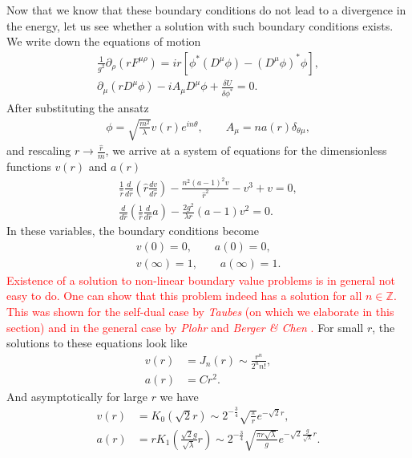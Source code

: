    \indent Now that we know that these boundary conditions do not lead to a divergence in the energy, let us see whether a solution with such boundary conditions exists. We write down the equations of motion
    \begin{align}
        \frac{1}{g^2}  \partial_{\rho}(r F^{\mu \rho}) = i r \left[\phi^* \left(D^{\mu}\phi\right) - \left(D^{\mu}\phi \right)^* \phi \right], \nonumber \\
        \partial_{\mu} \left(r D^{\mu} \phi \right) - i A_{\mu} D^{\mu} \phi + \frac{\delta U}{\delta \phi^*} =0.
    \end{align}
    After substituting the ansatz
    \begin{align}
        \phi = \sqrt{\frac{m^2}{\lambda}}v(r) e^{i n \theta}, \qquad A_{\mu} = n a(r) \delta_{\theta \mu},
    \end{align}
    and rescaling $r\rightarrow \frac{\hat{r}}{m}$, we arrive at a system of equations for the dimensionless functions $v(r)$ and $a(r)$
    \begin{align}
        \frac{1}{\hat{r}} \frac{d }{d \hat{r}} \left(\hat{r} \frac{d v}{d \hat{r}} \right) - \frac{n^2 (a-1)^2 v}{\hat{r}^2} -v^3 +v =0,  \\
        \frac{d}{d \hat{r}}\left(\frac{1}{\hat{r}}\frac{d}{d \hat{r}} a \right)- \frac{2 g^2}{\lambda r} (a-1)v^2=0.
    \end{align}
    In these variables, the boundary conditions become
    \begin{align}
        v(0) = 0, \qquad a(0)=0, \\
        v(\infty) =1, \qquad a(\infty) =1.
    \end{align}
    \textcolor{red}{Existence of a solution to non-linear boundary value problems is in general not easy to do. One can show that this problem indeed has a solution for all $n\in \mathbb{Z}$. This was shown for the self-dual case by \textit{Taubes} \cite{Taubes1980_1, Taubes1980_2} (on which we elaborate in this section) and in the general case by \textit{Plohr} and \textit{Berger \& Chen} \cite{Plohr1981, Berger1989}. }
    For small $r$, the solutions to these equations look like
    \begin{align}
        v(r)&= J_n(r) \sim \frac{r^n}{ 2^n n!}, \\
        a(r)&= C r^2.
    \end{align}
    And asymptotically for large $r$ we have
    \begin{align}
        v(r)&=K_0\left(\sqrt{2} r\right)\sim 2^{-\frac{3}{4}}\sqrt{\frac{\pi}{r}} e^{- \sqrt{2} r} , \label{eq:Asymptotics1_Abelian_Higgs} \\
        a(r)&=r K_1\left(\frac{\sqrt{2} g}{\sqrt{\lambda}} r \right)\sim 2^{- \frac{3}{4}} \sqrt{\frac{\pi r \sqrt{\lambda}}{g}} e^{- \sqrt{2} \frac{g}{\sqrt{\lambda}}r}. \label{eq:Asymptotics2_Abelian_Higgs}
    \end{align}
